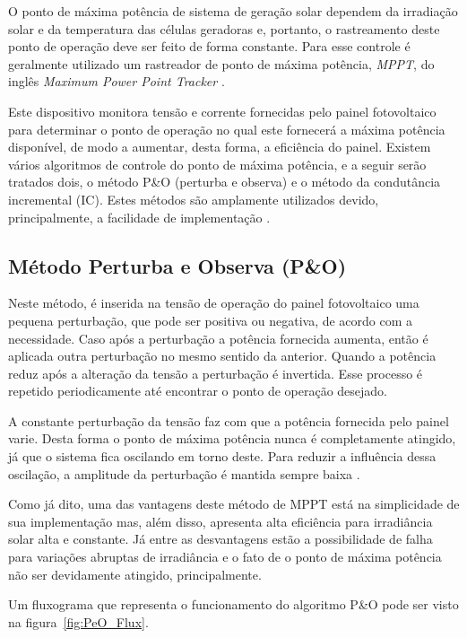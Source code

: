 \documentclass[
	12pt,				%
	openright,			%
	onseside,
	a4paper,			%
	english,			%
	french,				%
	spanish,			%
	brazil,				%
	]{abntex2}
\begin{document}
O ponto de máxima potência de sistema de geração solar dependem da irradiação solar e da temperatura das células geradoras e, portanto, o rastreamento deste ponto de operação deve ser feito de forma constante. Para esse controle é geralmente utilizado um rastreador de ponto de máxima potência, \emph{MPPT}, do inglês \textit{Maximum Power Point Tracker} \cite{Talha_MPPT}. 

Este dispositivo monitora tensão e corrente fornecidas pelo painel fotovoltaico para determinar o ponto de operação no qual este fornecerá a máxima potência disponível, de modo a aumentar, desta forma, a eficiência do painel. Existem vários algoritmos de controle do ponto de máxima potência, e a seguir serão tratados dois, o método P\&O (perturba e observa) e o método da condutância incremental (IC). Estes métodos são amplamente utilizados devido, principalmente, a facilidade de implementação \cite{MPPT_P&O_IC}\cite{Talha_MPPT}.


\subsection{Método Perturba e Observa (P\&O)}

Neste método, é inserida na tensão de operação do painel fotovoltaico uma pequena perturbação, que pode ser positiva ou negativa, de acordo com a necessidade. Caso após a perturbação a potência fornecida aumenta, então é aplicada outra perturbação no mesmo sentido da anterior. Quando a potência reduz após a alteração da tensão a perturbação é invertida. Esse processo é repetido periodicamente até encontrar o ponto de operação desejado\cite{Talha_MPPT}.

A constante perturbação da tensão faz com que a potência fornecida pelo painel varie. Desta forma o ponto de máxima potência nunca é completamente atingido, já que o sistema fica oscilando em torno deste. Para reduzir a influência dessa oscilação, a amplitude da perturbação é mantida sempre baixa \cite{MPPT_P&O_IC}.

Como já dito, uma das vantagens deste método de MPPT está na simplicidade de sua implementação mas, além disso, apresenta alta eficiência para irradiância solar alta e constante. Já entre as desvantagens estão a possibilidade de falha para variações abruptas de irradiância e o fato de o ponto de máxima potência não ser devidamente atingido, principalmente\cite{MPPT_P&O_IC}.

Um fluxograma que representa o funcionamento do algoritmo P\&O pode ser visto na figura~\ref{fig:PeO_Flux}.
\end{document}
